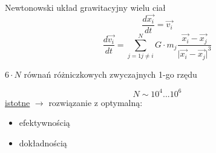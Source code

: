 \begin{frame}{Newtonowski układ grawitacyjny wielu ciał}
  $$\frac{d \vec{x_i}}{dt} = \vec{v_i}$$
  $$\frac{d \vec{v_i}}{dt} =\sum_{j = 1 j \not= i}^{N}G \cdot m_j \frac{\vec{x_i} - \vec{x_j}}{{\vert{\vec{x_i} - \vec{x_j}}\vert}^3}$$
  \begin{center}
  	$6 \cdot N$ równań różniczkowych zwyczajnych 1-go rzędu
  \end{center}
  $$N \sim 10^4 ... 10^6$$
  \underline{istotne} $\rightarrow$ rozwiązanie z optymalną:
  \begin{itemize}
    \item efektywnością
    \item dokładnością
  \end{itemize}
\end{frame}